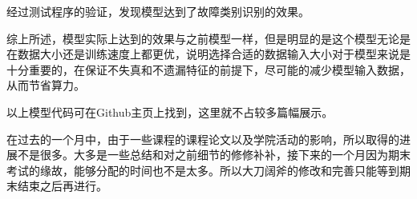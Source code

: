 \documentclass{article}
\begin{document}
	经过测试程序的验证，发现模型达到了故障类别识别的效果。
	
	综上所述，模型实际上达到的效果与之前模型一样，但是明显的是这个模型无论是在数据大小还是训练速度上都更优，说明选择合适的数据输入大小对于模型来说是十分重要的，在保证不失真和不遗漏特征的前提下，尽可能的减少模型输入数据，从而节省算力。
	
	以上模型代码可在Github主页上找到，这里就不占较多篇幅展示。
	
	
	在过去的一个月中，由于一些课程的课程论文以及学院活动的影响，所以取得的进展不是很多。大多是一些总结和对之前细节的修修补补，接下来的一个月因为期末考试的缘故，能够分配的时间也不是太多。所以大刀阔斧的修改和完善只能等到期末结束之后再进行。
	
\end{document}
